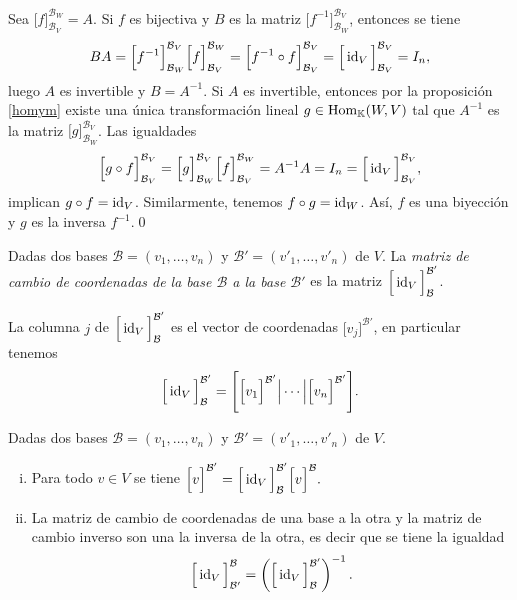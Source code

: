 Sea $\Big[ f \Big]^{\mathcal{B}_W}_{\mathcal{B}_V}=A$. Si $f$ es bijectiva y $B$ es la matriz $\Big[ f^{-1} \Big]_{\mathcal{B}_W}^{\mathcal{B}_V}$, entonces se tiene
$$BA=\Big[ f^{-1} \Big]_{\mathcal{B}_W}^{\mathcal{B}_V}\Big[ f \Big]^{\mathcal{B}_W}_{\mathcal{B}_V}= \Big[ f^{-1}\circ f \Big]^{\mathcal{B}_V}_{\mathcal{B}_V}=\Big[\operatorname{id}_V\Big]^{\mathcal{B}_V}_{\mathcal{B}_V}=I_n,$$
luego $A$ es invertible y $B=A^{-1}$. Si $A$ es invertible, entonces por la proposici\'on \ref{homym} existe una \'unica transformaci\'on lineal $g\in \operatorname{Hom}_{\mathbb{K}}(W,V)$ tal que $A^{-1}$ es la matriz $\Big[ g \Big]^{\mathcal{B}_V}_{\mathcal{B}_W}$. Las igualdades
$$\Big[ g\circ f \Big]^{\mathcal{B}_V}_{\mathcal{B}_V}=\Big[ g \Big]^{\mathcal{B}_V}_{\mathcal{B}_W}\Big[ f \Big]^{\mathcal{B}_W}_{\mathcal{B}_V}=A^{-1}A=I_n=\Big[ \operatorname{id}_V \Big]^{\mathcal{B}_V}_{\mathcal{B}_V},$$
implican $g\circ f=\operatorname{id}_V$. Similarmente, tenemos $f\circ g=\operatorname{id}_W$. As\'i, $f$ es una biyecci\'on y $g$ es la inversa $f^{-1}$.\qed

\begin{defn}
Dadas dos bases $\mathcal{B}=(v_1,\ldots,v_n)$ y $\mathcal{B}'=(v'_1,\ldots,v'_n)$ de $V$. La \emph{matriz de cambio de coordenadas de la base $\mathcal{B}$ a la base $\mathcal{B}'$} es la matriz $\Big[\operatorname{id}_V\Big]^{\mathcal{B}'}_\mathcal{B}$.
\end{defn}

\begin{obs}
La columna $j$ de $\Big[\operatorname{id}_V\Big]^{\mathcal{B}'}_{\mathcal{B}}$ es el vector de coordenadas $\Big[ v_j\Big]^{\mathcal{B}'}$, en particular tenemos
$$\Big[\operatorname{id}_V\Big]^{\mathcal{B}'}_{\mathcal{B}}=\Bigg[\Big[ v_1\Big]^{\mathcal{B}'}\Big|\cdots \Big| \Big[ v_n\Big]^{\mathcal{B}'}\Bigg].$$
\end{obs}

\begin{prop}
Dadas dos bases $\mathcal{B}=(v_1,\ldots,v_n)$ y $\mathcal{B}'=(v'_1,\ldots,v'_n)$ de $V$.
\begin{enumerate}[(i)]
\item Para todo $v\in V$ se tiene $\Big[v\Big]^{\mathcal{B}'}=\Big[\operatorname{id}_V\Big]^{\mathcal{B}'}_\mathcal{B}\Big[v\Big]^{\mathcal{B}}.$
\item La matriz de cambio de coordenadas de una base a la otra y la matriz de cambio inverso son una la inversa de la otra, es decir que se tiene la igualdad
$$\Big[\operatorname{id}_V\Big]^{\mathcal{B}}_{\mathcal{B}'}=\left(\Big[\operatorname{id}_V\Big]^{\mathcal{B}'}_{\mathcal{B}}\right)^{-1}.$$
\end{enumerate}
\end{prop}

